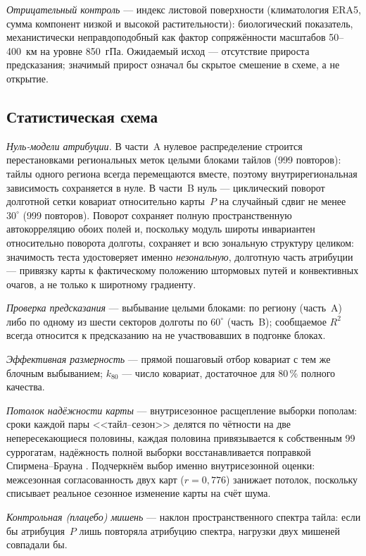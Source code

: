 \documentclass[11pt,a4paper]{article}
\begin{document}
\emph{Отрицательный контроль} --- индекс листовой поверхности (климатология ERA5, сумма компонент низкой и высокой растительности): биологический показатель, механистически неправдоподобный как фактор сопряжённости масштабов 50--400~км на уровне 850~гПа. Ожидаемый исход --- отсутствие прироста предсказания; значимый прирост означал бы скрытое смешение в схеме, а не открытие.

\subsection{Статистическая схема}

\emph{Нуль-модели атрибуции.} В части~A нулевое распределение строится перестановками региональных меток целыми блоками тайлов (999 повторов): тайлы одного региона всегда перемещаются вместе, поэтому внутрирегиональная зависимость сохраняется в нуле. В части~B нуль --- циклический поворот долготной сетки ковариат относительно карты~$P$ на случайный сдвиг не менее $30^\circ$ (999 повторов). Поворот сохраняет полную пространственную автокорреляцию обоих полей и, поскольку модуль широты инвариантен относительно поворота долготы, сохраняет и всю зональную структуру целиком: значимость теста удостоверяет именно \emph{незональную}, долготную часть атрибуции --- привязку карты к фактическому положению штормовых путей и конвективных очагов, а не только к широтному градиенту.

\emph{Проверка предсказания} --- выбывание целыми блоками: по региону (часть~A) либо по одному из шести секторов долготы по $60^\circ$ (часть~B); сообщаемое $R^2$ всегда относится к предсказанию на не участвовавших в подгонке блоках.

\emph{Эффективная размерность} --- прямой пошаговый отбор ковариат с тем же блочным выбыванием; $k_{80}$ --- число ковариат, достаточное для 80\,\% полного качества.

\emph{Потолок надёжности карты} --- внутрисезонное расщепление выборки пополам: сроки каждой пары <<тайл--сезон>> делятся по чётности на две непересекающиеся половины, каждая половина привязывается к собственным 99 суррогатам, надёжность полной выборки восстанавливается поправкой Спирмена--Брауна \cite{Spearman1910,Brown1910}. Подчеркнём выбор именно внутрисезонной оценки: межсезонная согласованность двух карт ($r=0{,}776$) занижает потолок, поскольку списывает реальное сезонное изменение карты на счёт шума.

\emph{Контрольная (плацебо) мишень} --- наклон пространственного спектра тайла: если бы атрибуция~$P$ лишь повторяла атрибуцию спектра, нагрузки двух мишеней совпадали бы.
\end{document}
